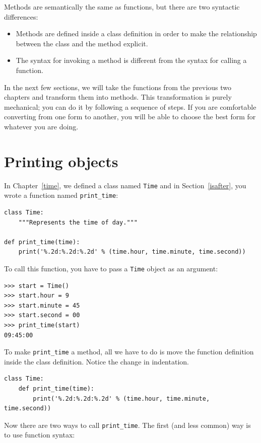 \documentclass[10pt]{book}
\begin{document}
Methods are semantically the same as functions, but there are
two syntactic differences:

\begin{itemize}

\item Methods are defined inside a class definition in order
to make the relationship between the class and the method explicit.

\item The syntax for invoking a method is different from the
syntax for calling a function.

\end{itemize}

In the next few sections, we will take the functions from the previous
two chapters and transform them into methods.  This transformation is
purely mechanical; you can do it by following a sequence of
steps.  If you are comfortable converting from one form to another,
you will be able to choose the best form for whatever you are doing.


\section{Printing objects}

In Chapter~\ref{time}, we defined a class named
{\tt Time} and in Section~\ref{isafter}, you
wrote a function named \verb"print_time":

\begin{verbatim}
class Time:
    """Represents the time of day."""

def print_time(time):
    print('%.2d:%.2d:%.2d' % (time.hour, time.minute, time.second))
\end{verbatim}
%
To call this function, you have to pass a {\tt Time} object as an
argument:

\begin{verbatim}
>>> start = Time()
>>> start.hour = 9
>>> start.minute = 45
>>> start.second = 00
>>> print_time(start)
09:45:00
\end{verbatim}
%
To make \verb"print_time" a method, all we have to do is
move the function definition inside the class definition.  Notice
the change in indentation.

\begin{verbatim}
class Time:
    def print_time(time):
        print('%.2d:%.2d:%.2d' % (time.hour, time.minute, time.second))
\end{verbatim}
%
Now there are two ways to call \verb"print_time".  The first
(and less common) way is to use function syntax:
\end{document}
